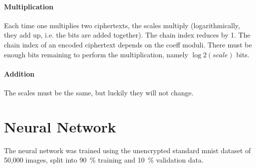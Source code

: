
\paragraph{Multiplication}
Each time one multiplies two ciphertexts, the scales multiply (logarithmically, they add up, i.e. the bits are added together).
The chain index reduces by 1. The chain index of an encoded ciphertext depends on the coeff moduli.
There must be enough bits remaining to perform the multiplication, namely $\log2(scale)$ bits.

\paragraph{Addition}
The scales must be the same, but luckily they will not change.



\section{Neural Network}
The neural network was trained using the unencrypted standard \gls{mnist} dataset of 50,000 images, split into \SI{90}{\percent} training and \SI{10}{\percent} validation data.

